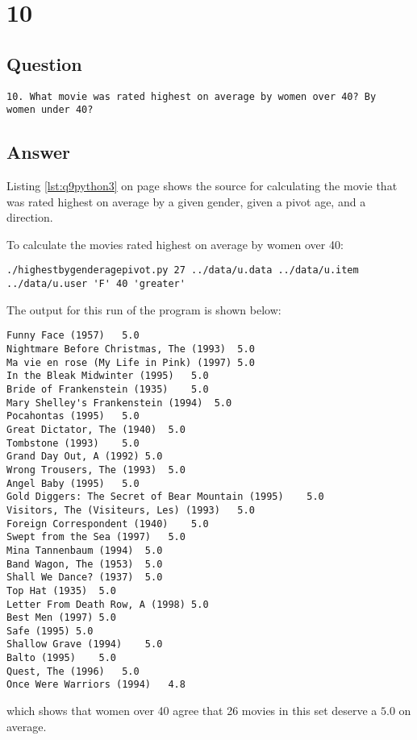 \documentclass[letterpaper,11pt]{article}
\begin{document}
\newpage

\section*{10}

\subsection*{Question}

\begin{verbatim}
10. What movie was rated highest on average by women over 40? By
women under 40?
\end{verbatim}

\subsection*{Answer}

Listing \ref{lst:q9python3} on page \pageref{lst:q9python3} shows the source for calculating the movie that was rated highest on average by a given gender, given a pivot age, and a direction.

To calculate the movies rated highest on average by women over 40:
\begin{lstlisting}[frame=single]
./highestbygenderagepivot.py 27 ../data/u.data ../data/u.item ../data/u.user 'F' 40 'greater'
\end{lstlisting}

The output for this run of the program is shown below:
\begin{lstlisting}[frame=single]
Funny Face (1957)	5.0
Nightmare Before Christmas, The (1993)	5.0
Ma vie en rose (My Life in Pink) (1997)	5.0
In the Bleak Midwinter (1995)	5.0
Bride of Frankenstein (1935)	5.0
Mary Shelley's Frankenstein (1994)	5.0
Pocahontas (1995)	5.0
Great Dictator, The (1940)	5.0
Tombstone (1993)	5.0
Grand Day Out, A (1992)	5.0
Wrong Trousers, The (1993)	5.0
Angel Baby (1995)	5.0
Gold Diggers: The Secret of Bear Mountain (1995)	5.0
Visitors, The (Visiteurs, Les) (1993)	5.0
Foreign Correspondent (1940)	5.0
Swept from the Sea (1997)	5.0
Mina Tannenbaum (1994)	5.0
Band Wagon, The (1953)	5.0
Shall We Dance? (1937)	5.0
Top Hat (1935)	5.0
Letter From Death Row, A (1998)	5.0
Best Men (1997)	5.0
Safe (1995)	5.0
Shallow Grave (1994)	5.0
Balto (1995)	5.0
Quest, The (1996)	5.0
Once Were Warriors (1994)	4.8
\end{lstlisting}
which shows that women over 40 agree that 26 movies in this set deserve a $5.0$ on average.
\end{document}
